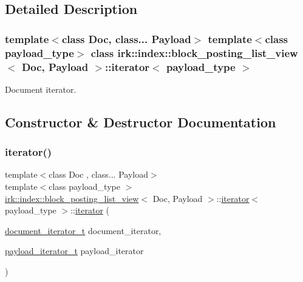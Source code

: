 \subsection{Detailed Description}
\subsubsection*{template$<$class Doc, class... Payload$>$\newline
template$<$class payload\+\_\+type$>$\newline
class irk\+::index\+::block\+\_\+posting\+\_\+list\+\_\+view$<$ Doc, Payload $>$\+::iterator$<$ payload\+\_\+type $>$}

Document iterator. 

\subsection{Constructor \& Destructor Documentation}
\mbox{\label{classirk_1_1index_1_1block__posting__list__view_1_1iterator_a72038769859b9c21965abab4736e1e9c}} 
\subsubsection{\texorpdfstring{iterator()}{iterator()}}
{\footnotesize\ttfamily template$<$class Doc , class... Payload$>$ \\
template$<$class payload\+\_\+type $>$ \\
\mbox{\hyperlink{classirk_1_1index_1_1block__posting__list__view}{irk\+::index\+::block\+\_\+posting\+\_\+list\+\_\+view}}$<$ Doc, Payload $>$\+::\mbox{\hyperlink{classirk_1_1index_1_1block__posting__list__view_1_1iterator}{iterator}}$<$ payload\+\_\+type $>$\+::\mbox{\hyperlink{classirk_1_1index_1_1block__posting__list__view_1_1iterator}{iterator}} (\begin{DoxyParamCaption}\item[{\mbox{\hyperlink{classirk_1_1index_1_1block__posting__list__view_a5b6c3f910a1bd819ff3efa0a619e32a0}{document\+\_\+iterator\+\_\+t}}}]{document\+\_\+iterator,  }\item[{\mbox{\hyperlink{classirk_1_1index_1_1block__posting__list__view_ad7beed21d25c7cb3b2b389c28022be12}{payload\+\_\+iterator\+\_\+t}}}]{payload\+\_\+iterator }\end{DoxyParamCaption})\hspace{0.3cm}{\ttfamily [inline]}}



